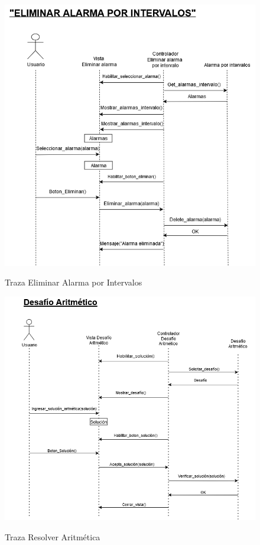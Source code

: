 \begin{figure}[H]
	\centering
	\caption{Traza Eliminar Alarma por Intervalos}
	\includegraphics[width=\textwidth]{./img/Eliminar_Alarma_Intervalos.png}
        \vspace{10pt}
	\label{fig:Traza Eliminar Alarma por Intervalos}
\end{figure}

\begin{figure}[H]
	\centering
	\caption{Traza Resolver Aritmética}
	\includegraphics[width=\textwidth]{./img/Desafio_Aritmetico.png}
        \vspace{10pt}
	\label{fig:Traza Resolver Aritmética}
\end{figure}

